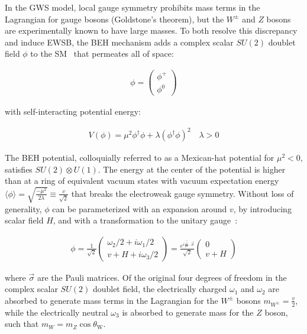 In the GWS model, local gauge symmetry prohibits mass terms in the Lagrangian for gauge bosons (Goldstone's theorem), but the $W^\pm$ and $Z$ bosons are experimentally known to have large masses.
To both resolve this discrepancy and induce EWSB, the BEH mechanism adds a complex scalar $SU(2)$ doublet field $\phi$ to the SM~\cite{nagashima_2013_V2} that permeates all of space:
\begin{linenomath*}
\begin{align}
\phi=\left(\begin{array}{l}
\phi^{+} \\
\phi^0
\end{array}\right)
\end{align}
\end{linenomath*}
with self-interacting potential energy:
\begin{linenomath*}
\begin{align}
V(\phi) = \mu^2 \phi^{\dagger} \phi + \lambda\left(\phi^{\dagger} \phi\right)^2 \quad \lambda >0
\end{align}
\end{linenomath*}
The BEH potential, colloquially referred to as a Mexican-hat potential for $\mu^2 < 0$, satisfies $SU(2) \otimes U(1)$.
The energy at the center of the potential is higher than at a ring of equivalent vacuum states with vacuum expectation energy $\langle\phi\rangle=\sqrt{\frac{-\mu^2}{2 \lambda}} \equiv \frac{v}{\sqrt{2}}$ that breaks the electroweak gauge symmetry.
Without loss of generality, $\phi$ can be parameterized with an expansion around $v$, by introducing scalar field $H$, and with a transformation to the unitary gauge~\cite{nagashima_2013_V2}:
\begin{linenomath*}
\begin{align}
\phi
=\frac{1}{\sqrt{2}}
\left(\begin{array}{l}
\omega_2/2 + i \omega_1/2 \\
v + H + i \omega_3/2
\end{array}\right)
= \frac{e^{i \frac{\vec{\omega}}{2v} \cdot \vec{\sigma}}}{\sqrt{2}}
\left(\begin{array}{c}
0 \\
v+H
\end{array}\right)
\end{align}
\end{linenomath*}
where $\vec{\sigma}$ are the Pauli matrices.
Of the original four degrees of freedom in the complex scalar $SU(2)$ doublet field, the electrically charged $\omega_1$ and $\omega_2$ are absorbed to generate mass terms in the Lagrangian for the $W^\pm$ bosons $m_{W^\pm} = \frac{v}{2}$, while the electrically neutral $\omega_3$ is absorbed to generate mass for the $Z$ boson, such that $m_W = m_Z \cos \theta_{\mathrm{W}}$.
